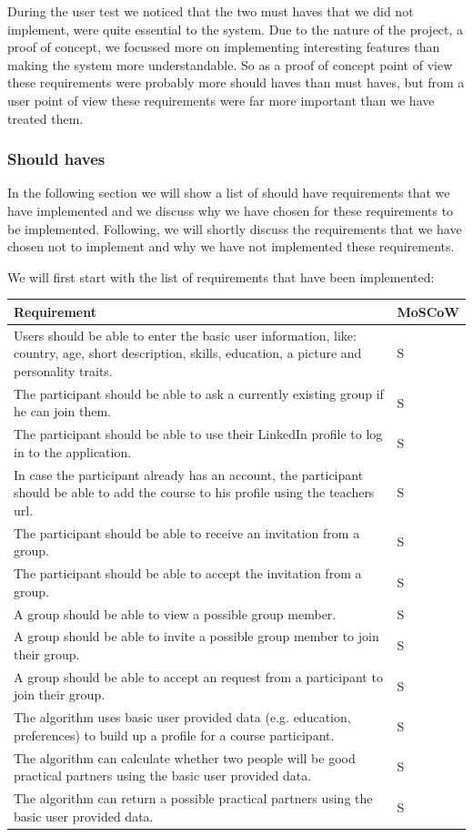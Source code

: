 During the user test we noticed that the two must haves that we did not implement, were quite essential to the system.
Due to the nature of the project, a proof of concept, we focussed more on implementing interesting features than making the system more understandable.
So as a proof of concept point of view these requirements were probably more should haves than must haves, but from a user point of view these requirements were far more important than we have treated them.

\subsubsection{Should haves}
In the following section we will show a list of should have requirements that we have implemented and we discuss why we have chosen for these requirements to be implemented.
Following, we will shortly discuss the requirements that we have chosen not to implement and why we have not implemented these requirements.

We will first start with the list of requirements that have been implemented:

\begin{tabular}{ | p{12cm} | p{2cm} | }
\hline
\textbf{Requirement} & \textbf{MoSCoW} \\ \hline
Users should be able to enter the basic user information, like: country, age, short description, skills, education, a picture and personality traits. & S \\ \hline
The participant should be able to ask a currently existing group if he can join them. & S \\ \hline
The participant should be able to use their LinkedIn profile to log in to the application. & S \\ \hline
In case the participant already has an account, the participant should be able to add the course to his profile using the teachers url. & S \\ \hline
The participant should be able to receive an invitation from a group. & S \\ \hline
The participant should be able to accept the invitation from a group. & S \\ \hline
A group should be able to view a possible group member. & S \\ \hline
A group should be able to invite a possible group member to join their group. & S \\ \hline
A group should be able to accept an request from a participant to join their group. & S \\ \hline
The algorithm uses basic user provided data (e.g. education, preferences) to build up a profile for a course participant. & S \\ \hline
The algorithm can calculate whether two people will be good practical partners using the basic user provided data. & S \\ \hline
The algorithm can return a possible practical partners using the basic user provided data. & S \\
\hline
\end{tabular}

